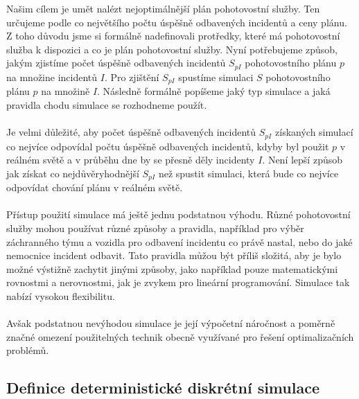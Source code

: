 Našim cílem je umět nalézt nejoptimálnější plán pohotovostní služby.
Ten určujeme podle co největšího počtu úspěšně odbavených incidentů a ceny plánu.
Z toho důvodu jsme si formálně nadefinovali protředky, které má pohotovostní služba k dispozici a co je plán pohotovostní služby.
Nyní potřebujeme způsob, jakým zjistíme počet úspěšně odbavených incidentů $S_{pI}$ pohotovostního plánu $p$ na množine incidentů $I$.
Pro zjištění $S_{pI}$ spustíme simulaci $S$ pohotovostního plánu $p$ na množině $I$.
Následně formálně popíšeme jaký typ simulace a jaká pravidla chodu simulace se rozhodneme použít. %
\\
\\
Je velmi důležité, aby počet úspěšně odbavených incidentů $S_{pI}$ získaných simulací co nejvíce odpovídal počtu úspěšně odbavených incidentů,
kdyby byl použit $p$ v reálném světě a v průběhu dne by se přesně děly incidenty $I$.
Není lepší způsob jak získat co nejdůvěryhodnější $S_{pI}$ než spustit simulaci, která bude co nejvíce odpovídat chování plánu v reálném světě.
\\
\\
Přístup použití simulace má ještě jednu podstatnou výhodu.
Různé pohotovostní služby mohou používat různé způsoby a pravidla, například pro výběr záchranného týmu a vozidla pro odbavení incidentu co právě nastal, nebo do jaké nemocnice incident odbavit.
Tato pravidla můžou být příliš složitá, aby je bylo možné výstižně zachytit jinými způsoby, jako například pouze matematickými rovnostmi a nerovnostmi, jak je zvykem pro lineární programování.
Simulace tak nabízí vysokou flexibilitu.
\\
\\
Avšak podstatnou nevýhodou simulace je její výpočetní náročnost a poměrně značné omezení použitelných technik obecně využívané pro řešení optimalizačních problémů. %

\subsection{Definice deterministické diskrétní simulace}

